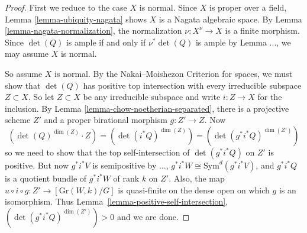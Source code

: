 \begin{proof}
First we reduce to the case $X$ is normal.
Since $X$ is proper over a field, Lemma \ref{lemma-ubiquity-nagata} shows $X$
is a Nagata algebraic space.
By Lemma \ref{lemma-nagata-normalization}, the normalization
$\nu : X^\nu \to X$ is a finite morphism.
Since $\det(Q)$ is ample if and only if $\nu^*\det(Q)$ is ample by
Lemma ..., we may
assume $X$ is normal.

So assume $X$ is normal.
By the Nakai--Moishezon Criterion for spaces,
we must show that $\det(Q)$ has positive top intersection with
every irreducible subspace $Z \subset X$.
So let $Z \subset X$ be any irreducible subspace and write $i : Z \to X$ for
the inclusion.
By Lemma \ref{lemma-chow-noetherian-separated}, there is a projective
scheme $Z'$ and a proper birational morphism $g : Z' \to Z$.
Now
$$
  (\det(Q)^{\dim(Z)} \cdot Z)
    = (\det(i^*Q)^{\dim(Z)})
    = (\det(g^*i^*Q)^{\dim(Z')})
$$
so we need to show that the top self-intersection of $\det(g^*i^*Q)$ on $Z'$
is positive.
But now $g^*i^*V$ is semipositive by ...,
$g^*i^*W \cong \mathrm{Sym}^d(g^*i^*V)$, and $g^*i^*Q$ is a
quotient bundle of $g^*i^*W$ of rank $k$ on $Z'$.
Also, the map $u \circ i \circ g : Z' \to [\mathrm{Gr}(W,k)/G]$ is quasi-finite
on the dense open on which $g$ is an isomorphism.
Thus Lemma~\ref{lemma-positive-self-intersection},
$(\det(g^*i^*Q)^{\dim(Z')}) > 0$ and we are done.
  


  
\end{proof}





